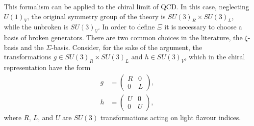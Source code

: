 This formalism can be applied to the chiral limit of QCD. In this case, neglecting $U(1)_V$, the original symmetry group of the theory is $SU(3)_R \times SU(3)_L$, while the unbroken is $SU(3)_V$. In order to define $\Xi$ it is necessary to choose a basis of broken generators. There are two common choices in the literature, the $\xi$-basis and the $\Sigma$-basis. Consider, for the sake of the argument, the transformations $g \in SU(3)_R \times SU(3)_L$ and $h \in SU(3)_V$, which in the chiral representation have the form
\begin{subequations}
  \begin{align}
    g &= \begin{pmatrix} R & 0 \\ 0 & L \end{pmatrix} , \\
    h &= \begin{pmatrix} U & 0 \\ 0 & U \end{pmatrix} , 
    \label{eq:g_and_h_definitions}
  \end{align}
\end{subequations}
where $R$, $L$, and $U$ are $SU(3)$ transformations acting on light flavour indices.

